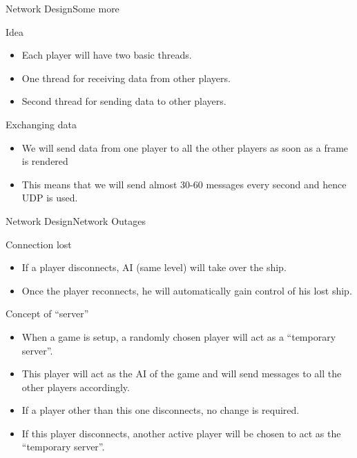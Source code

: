 \documentclass{beamer}
\begin{document}
\begin{frame}{Network Design}{Some more}	
	\begin{block}{Idea}
		\begin{itemize}
			\item Each player will have two basic threads.
			\item One thread for receiving data from other players.
			\item Second thread for sending data to other players.
		\end{itemize}
	\end{block}

	\begin{block}{Exchanging data}
		\begin{itemize}
			\item We will send data from one player to all the other players as soon as a frame is rendered
			\item This means that we will send almost 30-60 messages every second and hence UDP is used.
		\end{itemize}
	\end{block}
\end{frame}

\begin{frame}{Network Design}{Network Outages}
	\begin{block}{Connection lost}
		\begin{itemize}
			\item If a player disconnects, AI (same level) will take over the ship.
			\item Once the player reconnects, he will automatically gain control of his lost ship.
		\end{itemize}
	\end{block}	
	\begin{block}{Concept of ``server''}
		\begin{itemize}
			\item When a game is setup, a randomly chosen player will act as a ``temporary server''.
			\item This player will act as the AI of the game and will send messages to all the other players accordingly.
			\item If a player other than this one disconnects, no change is required.
			\item If this player disconnects, another active player will be chosen to act as the ``temporary server''.
		\end{itemize}
	\end{block}
\end{frame}
\end{document}
